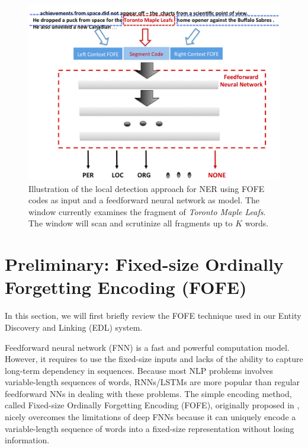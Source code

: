 \documentclass[11pt]{article}
\begin{document}
\begin{figure}[t]
\centering
\includegraphics[width=0.75\linewidth]{Figure-Diagram.png}
\caption{Illustration of the local detection approach for NER using FOFE codes as input and a feedforward neural network as model. The window currently examines the fragment of {\it Toronto Maple Leafs}. The window will scan and scrutinize all fragments up to $K$ words. }
\label{Fig:FOFE-NER-diagram}
\end{figure}

\section{Preliminary: Fixed-size Ordinally Forgetting Encoding (FOFE) }

In this section, we will first briefly review the FOFE technique used in our Entity Discovery and Linking (EDL) system.

Feedforward neural network (FNN) is a fast and powerful computation model. 
However, it requires to use the fixed-size inputs and 
lacks of the ability to capture long-term dependency in sequences. 
Because most NLP problems involves variable-length sequences of words, 
RNNs/LSTMs are more popular than regular feedforward NNs in dealing with these problems. 
The simple encoding method, called Fixed-size Ordinally Forgetting Encoding (FOFE), 
originally proposed in \cite{zhang2015fixed}, nicely overcomes the limitations of deep FNNs because it 
can uniquely encode a variable-length sequence of words into a fixed-size representation without losing information. 
\end{document}
